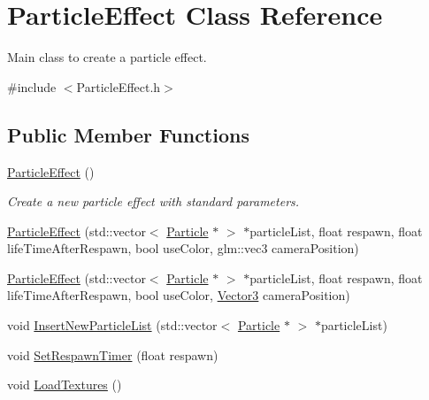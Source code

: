 \hypertarget{class_particle_effect}{}\section{Particle\+Effect Class Reference}
\label{class_particle_effect}


Main class to create a particle effect.  




{\ttfamily \#include $<$Particle\+Effect.\+h$>$}

\subsection*{Public Member Functions}
\begin{DoxyCompactItemize}
\item 
\mbox{\label{class_particle_effect_adcfcd6ebe940cf54cb91af3543ed815d}} 
\mbox{\hyperlink{class_particle_effect_adcfcd6ebe940cf54cb91af3543ed815d}{Particle\+Effect}} ()
\begin{DoxyCompactList}\small\item\em Create a new particle effect with standard parameters. \end{DoxyCompactList}\item 
\mbox{\hyperlink{class_particle_effect_aa3898c1343d6d6c1cc7d6ace376159f6}{Particle\+Effect}} (std\+::vector$<$ \mbox{\hyperlink{struct_particle}{Particle}} $\ast$ $>$ $\ast$particle\+List, float respawn, float life\+Time\+After\+Respawn, bool use\+Color, glm\+::vec3 camera\+Position)
\item 
\mbox{\hyperlink{class_particle_effect_a012d5b33e4a97ddb5b409be521f5ccee}{Particle\+Effect}} (std\+::vector$<$ \mbox{\hyperlink{struct_particle}{Particle}} $\ast$ $>$ $\ast$particle\+List, float respawn, float life\+Time\+After\+Respawn, bool use\+Color, \mbox{\hyperlink{struct_vector3}{Vector3}} camera\+Position)
\item 
void \mbox{\hyperlink{class_particle_effect_a2c4eafa97d1536cda09ad3c7cb771719}{Insert\+New\+Particle\+List}} (std\+::vector$<$ \mbox{\hyperlink{struct_particle}{Particle}} $\ast$ $>$ $\ast$particle\+List)
\item 
void \mbox{\hyperlink{class_particle_effect_a62001aac47d157b8bbdc7d749f0f5c93}{Set\+Respawn\+Timer}} (float respawn)
\item 
void \mbox{\hyperlink{class_particle_effect_acb6c2b7f72f1ac01b8307c475f7bfdd5}{Load\+Textures}} ()

\end{DoxyCompactItemize}
